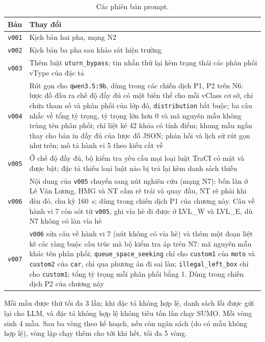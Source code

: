 \documentclass[../main.tex]{subfiles}
\begin{document}
\begin{table}[!htbp]
\centering
\small
\caption{Các phiên bản prompt.}
\label{table:3.prompts}
\begin{tabular}{|p{1.4cm}|>{\raggedright\arraybackslash}p{12.4cm}|}
\hline
\textbf{Bản} & \textbf{Thay đổi} \\ \hline
\texttt{v001} & Kịch bản hai pha, mạng N2 \\ \hline
\texttt{v002} & Kịch bản ba pha sau khảo sát hiện trường \\ \hline
\texttt{v003} & Thêm luật \texttt{uturn\_bypass}; tin nhắn thử lại kèm trạng thái các phân phối vType của đặc tả \\ \hline
\texttt{v004} & Rút gọn cho \texttt{qwen3.5:9b}, dùng trong các chiến dịch P1, P2 trên N6: lược đồ đầu ra chế độ đầy đủ có một biến thể cho mỗi vClass cơ sở, chỉ chứa tham số và phân phối của lớp đó, \texttt{distribution} bắt buộc; ba câu nhắc về tổng tỷ trọng, tỷ trọng lớn hơn 0 và mã nguyên mẫu không trùng tên phân phối; chỉ liệt kê 42 khóa có tính điểm; khung mẫu ngắn thay cho bản in đầy đủ của lược đồ JSON; phản hồi và lịch sử rút gọn như trên; mô tả hành vi 5 theo kiểu cắt về \\ \hline
\texttt{v005} & Ở chế độ đầy đủ, bộ kiểm tra yêu cầu mọi loại luật TraCI có mặt và được bật; đặc tả thiếu loại luật nào bị trả lại kèm danh sách thiếu \\ \hline
\texttt{v006} & Nội dung của \texttt{v005} chuyển sang nút nghiên cứu (mạng N7): bốn làn ở Lê Văn Lương, HMG và NT cấm rẽ trái và quay đầu, NT rẽ phải khi đèn đỏ, chu kỳ 160~s; dùng trong chiến dịch P1 của chương này. Câu về hành vi 7 còn sót từ \texttt{v005}, ghi vỉa hè đi được ở LVL\_W và LVL\_E, dù N7 không có làn vỉa hè \\ \hline
\texttt{v007} & \texttt{v006} sửa câu về hành vi 7 (nút không có vỉa hè) và thêm một đoạn liệt kê các ràng buộc cấu trúc mà bộ kiểm tra áp trên N7: mã nguyên mẫu khác tên phân phối; \texttt{queue\_space\_seeking} chỉ cho \texttt{custom1} của \texttt{moto} và \texttt{custom2} của \texttt{car}, chỉ qua phương án đi sai làn; \texttt{illegal\_left\_box} chỉ cho \texttt{custom1}; tổng tỷ trọng mỗi phân phối bằng 1. Dùng trong chiến dịch P2 của chương này \\ \hline
\end{tabular}
\end{table}

Mỗi mẫu được thử tối đa 3 lần; khi đặc tả không hợp lệ, danh sách lỗi được gửi lại cho LLM, và đặc tả không hợp lệ không tiêu tốn lần chạy SUMO. Mỗi vòng sinh 4 mẫu. Sau ba vòng theo kế hoạch, nếu còn ngân sách (do có mẫu không hợp lệ), vòng lặp chạy thêm cho tới khi hết, tối đa 5 vòng.
\end{document}
